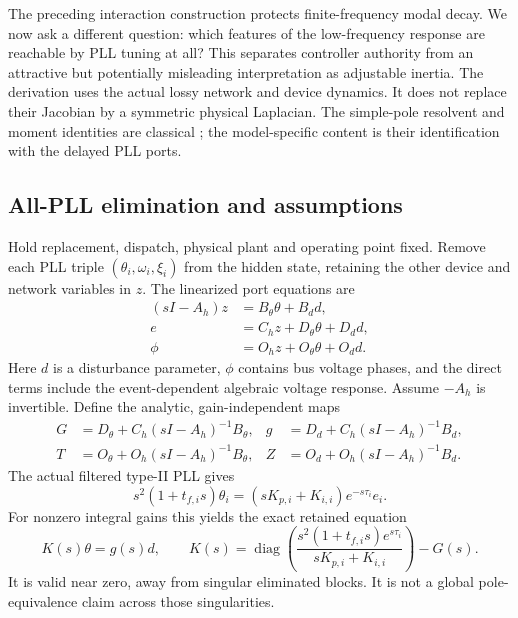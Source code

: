 \documentclass[11pt]{article}
\newcommand{\diag}{\operatorname{diag}}
\begin{document}
The preceding interaction construction protects finite-frequency modal decay.
We now ask a different question: which features of the low-frequency response
are reachable by PLL tuning at all? This separates controller authority from
an attractive but potentially misleading interpretation as adjustable inertia.
The derivation uses the actual lossy network and device dynamics. It does not
replace their Jacobian by a symmetric physical Laplacian. The simple-pole
resolvent and moment identities are classical \cite{beyn,malladamoments};
the model-specific content is their identification with the delayed PLL ports.

\subsection{All-PLL elimination and assumptions}
Hold replacement, dispatch, physical plant and operating point fixed. Remove
each PLL triple $(\theta_i,\omega_i,\xi_i)$ from the hidden state, retaining
the other device and network variables in $z$. The linearized port equations are
\begin{align}
 (sI-A_h)z&=B_\theta\theta+B_d d,\\
 e&=C_hz+D_\theta\theta+D_dd,\\
 \phi&=O_hz+O_\theta\theta+O_dd.
\end{align}
Here $d$ is a disturbance parameter, $\phi$ contains bus voltage phases, and
the direct terms include the event-dependent algebraic voltage response.
Assume $-A_h$ is invertible. Define the analytic, gain-independent maps
\begin{align}
 G&=D_\theta+C_h(sI-A_h)^{-1}B_\theta,&
 g&=D_d+C_h(sI-A_h)^{-1}B_d,\\
 T&=O_\theta+O_h(sI-A_h)^{-1}B_\theta,&
 Z&=O_d+O_h(sI-A_h)^{-1}B_d.
\end{align}
The actual filtered type-II PLL gives
\[
 s^2(1+t_{f,i}s)\theta_i=(sK_{p,i}+K_{i,i})e^{-s\tau_i}e_i.
\]
For nonzero integral gains this yields the exact retained equation
\begin{equation}
 K(s)\theta=g(s)d,\qquad
 K(s)=\diag\!\left(
 \frac{s^2(1+t_{f,i}s)e^{s\tau_i}}{sK_{p,i}+K_{i,i}}
 \right)-G(s).
 \label{eq:momentK}
\end{equation}
It is valid near zero, away from singular eliminated blocks. It is not a
global pole-equivalence claim across those singularities.
\end{document}
